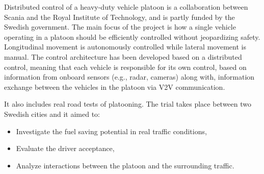 Distributed control of a heavy-duty vehicle platoon is a collaboration between Scania and the Royal Institute of Technology, and is partly funded by the Swedish government. The main focus of the project is how a single vehicle operating in a platoon should be efficiently controlled without jeopardizing safety. Longitudinal movement is autonomously controlled while lateral movement is manual. The control architecture has been developed based on a distributed control, meaning that each vehicle is responsible for its own control, based on information from onboard sensors (e.g., radar, cameras) along with, information exchange between the vehicles in the platoon via V2V communication. 


It also includes real road tests of platooning. The trial takes place between two Swedish cities and it aimed to: 
\begin{itemize}
    \item Investigate the fuel saving potential in real traffic conditions, 
    \item Evaluate the driver acceptance, 
    \item Analyze interactions between the platoon and the surrounding traffic. 
\end{itemize}

